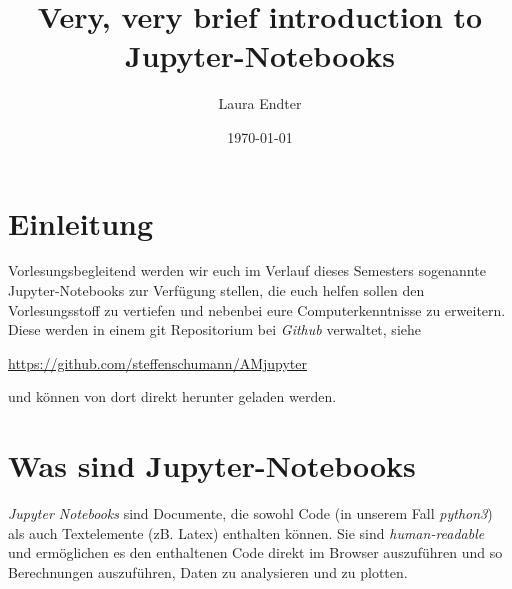 \documentclass[oneside,bibliography=totoc,listof=totoc,BCOR=5mm,DIV=12,colorlinks=true,linkcolor=blue,citecolor=black, urlcolor=blue]{article}
\author{Laura Endter}
\date{\today}
\title{Very, very brief introduction to Jupyter-Notebooks}
\begin{document}
\maketitle
\tableofcontents



\section{Einleitung}
\label{sec:org1dfb6c6}
Vorlesungsbegleitend werden wir euch im Verlauf dieses Semesters sogenannte Jupyter-Notebooks zur Verfügung stellen, die euch helfen sollen den Vorlesungsstoff zu vertiefen und nebenbei eure Computerkenntnisse zu erweitern. Diese werden in einem git Repositorium bei \emph{Github} verwaltet, siehe
\begin{center}
  \url{https://github.com/steffenschumann/AMjupyter}
\end{center}

und k\"onnen von dort direkt herunter geladen werden.


\section{Was sind Jupyter-Notebooks}
\label{sec:orgd657ea3}
\emph{Jupyter Notebooks} sind Documente, die sowohl Code (in unserem Fall \emph{python3}) als auch Textelemente (zB. Latex) enthalten können. Sie sind \emph{human-readable} und ermöglichen es den enthaltenen Code direkt im Browser auszuführen und so Berechnungen auszuführen, Daten zu analysieren und zu plotten.
\end{document}

